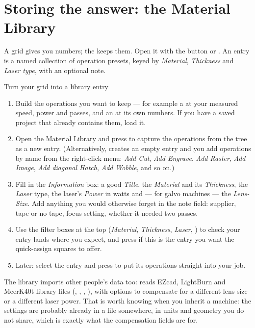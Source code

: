 \section{Storing the answer: the Material Library}

A grid gives you numbers; the  keeps them.
Open it with the  button or .
An entry is a named collection of operation presets, keyed by
\emph{Material}, \emph{Thickness} and \emph{Laser type}, with an optional note.

\begin{walkthrough}{Turn your grid into a library entry}
\begin{enumerate}[label=\arabic*.,leftmargin=1.4em]
  \item Build the operations you want to keep --- for example a 
        at your measured speed, power and passes, and an  at
        its own numbers. If you have a saved project that already contains them,
        load it.
  \item Open the Material Library and press  to capture the
        operations from the tree as a new entry. (Alternatively,
         creates an empty entry and you add operations by name from
        the right-click menu: \emph{Add Cut}, \emph{Add Engrave},
        \emph{Add Raster}, \emph{Add Image}, \emph{Add diagonal Hatch},
        \emph{Add Wobble}, and so on.)
  \item Fill in the \emph{Information} box: a good \emph{Title}, the
        \emph{Material} and its \emph{Thickness}, the \emph{Laser} type, the
        laser's \emph{Power} in watts and — for galvo machines — the
        \emph{Lens-Size}. Add anything you would otherwise forget in the note
        field: supplier, tape or no tape, focus setting, whether it needed two
        passes.
  \item Use the filter boxes at the top (\emph{Material}, \emph{Thickness},
        \emph{Laser}, ) to check your entry lands where you
        expect, and press  if this is the entry you want
        the quick-assign squares to offer.
  \item Later: select the entry and press  to put its
        operations straight into your job.
\end{enumerate}
\end{walkthrough}

\noindent The library imports other people's data too:  reads
EZcad, LightBurn and MeerK40t library files (, ,
, ), with options to compensate for a different lens size
or a different laser power. That is worth knowing when you inherit a machine: the
settings are probably already in a file somewhere, in units and geometry you do
not share, which is exactly what the compensation fields are for.

